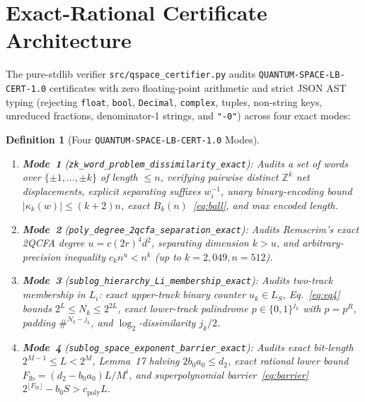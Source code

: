 \documentclass[11pt,twocolumn]{article}
\newtheorem{definition}{Definition}
\newcommand{\ZZ}{\mathbb{Z}}
\begin{document}
\section{Exact-Rational Certificate Architecture}\label{sec:certifier}
The pure-stdlib verifier \texttt{src/qspace\_certifier.py} audits \texttt{QUANTUM-SPACE-LB-CERT-1.0} certificates with zero floating-point arithmetic and strict JSON AST typing (rejecting \texttt{float}, \texttt{bool}, \texttt{Decimal}, \texttt{complex}, tuples, non-string keys, unreduced fractions, denominator-1 strings, and \texttt{"-0"}) across four exact modes:

\begin{definition}[Four \texttt{QUANTUM-SPACE-LB-CERT-1.0} Modes]\label{def:modes}
\leavevmode
\begin{enumerate}[leftmargin=*,nosep]
  \item \textbf{Mode~1} (\texttt{\small zk\_\allowbreak word\_\allowbreak problem\_\allowbreak dissimilarity\_\allowbreak exact}): Audits a set of words over $\{\pm 1,\dots,\pm k\}$ of length $\le n$, verifying pairwise distinct $\ZZ^k$ net displacements, explicit separating suffixes $w_i^{-1}$, unary binary-encoding bound $|\kappa_k(w)| \le (k+2)n$, exact $B_k(n)$~\eqref{eq:ball}, and max encoded length.
  \item \textbf{Mode~2} (\texttt{\small poly\_\allowbreak degree\_\allowbreak 2qcfa\_\allowbreak separation\_\allowbreak exact}): Audits Remscrim's exact 2QCFA degree $u = c(2r)^4 d^2$, separating dimension $k > u$, and arbitrary-precision inequality $c_k n^u < n^k$ (up to $k=2{,}049, n=512$).
  \item \textbf{Mode~3} (\texttt{\small sublog\_\allowbreak hierarchy\_\allowbreak Li\_\allowbreak membership\_\allowbreak exact}): Audits two-track membership in $L_i$: exact upper-track binary counter $u_k \in L_S$, Eq.~\eqref{eq:eq4} bounds $2^L \le N_k \le 2^{2L}$, exact lower-track palindrome $p \in \{0,1\}^{j_k}$ with $p = p^R$, padding $\#^{N_k - j_k}$, and $\log_2$-dissimilarity $j_k/2$.
  \item \textbf{Mode~4} (\texttt{\small sublog\_\allowbreak space\_\allowbreak exponent\_\allowbreak barrier\_\allowbreak exact}): Audits exact bit-length $2^{M-1} \le L < 2^M$, Lemma~17 halving $2 b_0 a_0 \le d_2$, exact rational lower bound $F_{\mathrm{lb}} = (d_2 - b_0 a_0) L / M^i$, and superpolynomial barrier~\eqref{eq:barrier} $2^{\lfloor F_{\mathrm{lb}}\rfloor} - b_0 S > c_{\mathrm{poly}} L$.
\end{enumerate}
\end{definition}
\end{document}
